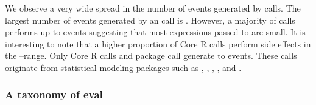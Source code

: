 \documentclass[USenglish,cleveref, autoref, thm-restate]{lipics-v2019}
\begin{document}
We observe a very wide spread in the number of events generated by \eval
calls. The largest number of events generated by an \eval call is
\EventsMaxCountRnd.  However, a majority of \eval calls performs up to
\EventsMaxRangeA events suggesting that most expressions passed to \eval are
small.  It is interesting to note that a higher proportion of Core R \eval
calls perform side effects in the \EventsMinRangeB--\EventsMaxRangeB range.
Only \EventsCoreEvalCountC Core R \eval calls and \EventsPackageEvalCountC
package \eval call generate \EventsMinRangeC to \EventsMaxRangeC events.
These \eval calls originate from statistical modeling packages such as
\mlogit, \mboost, \metafor, \lavaan, \mclust and \gamlss.


\subsubsection{A taxonomy of eval}

\end{document}
